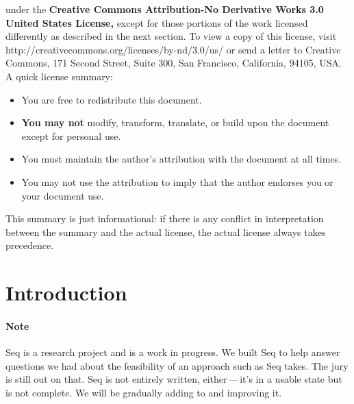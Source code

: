 \documentclass[twoside,10pt]{article}
\begin{document}
\vspace{0.15in}
	 under the {\bf Creative Commons Attribution-No Derivative Works 3.0 United States License,} except for those portions of the work licensed differently as described in the next section. To view a copy of this license, visit http:/\!/creativecommons.org/licenses/by-nd/3.0/us/ or send a letter to Creative Commons, 171 Second Street, Suite 300, San Francisco, California, 94105, USA.  A quick license summary:
	\begin{itemize}
	\item You are free to redistribute this document.
	\vspace{-0.5em}\item {\bf You may not} modify, transform, translate, or build upon the document except for personal use.   
	\vspace{-0.5em}\item You must maintain the author's attribution with the document at all times.
	\vspace{-0.5em}\item You may not use the attribution to imply that the author endorses you or your document use.  
	\end{itemize}
	This summary is just informational: if there is any conflict in interpretation between the summary and the actual license, the actual license always takes precedence.





\normalsize
\cleardoublepage

\tableofcontents
\clearpage


\clearpage\section{Introduction}

\paragraph{\color{red} Note} Seq is a research project and is a work in progress.  We built Seq to help answer questions we had about the feasibility of an approach such as Seq takes.  The jury is still out on that.  Seq is not entirely written, either\,---\,it's in a usable state but is not complete.  We will be gradually adding to and improving it.
\end{document}
